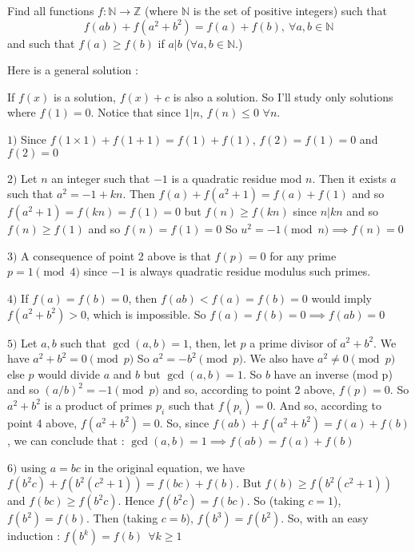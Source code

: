 \begin{mysolution}
	\begin{tcolorbox}Find all functions $ f: \mathbb{N} \rightarrow \mathbb{Z}$ (where $ \mathbb{N}$ is the set of positive integers) such that
\[ f(ab) + f\left(a^2 + b^2\right) = f(a) + f(b),\ \forall a, b \in \mathbb{N}
\]
and such that $ f(a) \geq f(b)$ if $ a | b$ ($ \forall a, b \in \mathbb{N}$.)\end{tcolorbox}

Here is a general solution :

If $ f(x)$ is a solution, $ f(x)+c$ is also a solution. So I'll study only solutions where $ f(1)=0$. Notice that since $ 1|n$, $ f(n)\leq 0$ $ \forall n$.

$ 1)$ Since $ f(1\times 1) + f(1 + 1) = f(1) + f(1)$, $ f(2) = f(1)=0$ and $ \boxed{f(2)=0}$ 

$ 2)$ Let $ n$ an integer such that $ -1$ is a quadratic residue mod $ n$. Then it exists $ a$ such that $ a^2 = - 1 + kn$.
Then $ f(a) + f(a^2 + 1) = f(a) + f(1)$ and so $ f(a^2 + 1) = f(kn) = f(1)=0$ but $ f(n)\geq f(kn)$ since $ n|kn$ and so $ f(n)\geq f(1)$ and so $ f(n) = f(1)=0$
So $ \boxed{u^2=-1\pmod{n}\implies f(n)=0}$ 

$ 3)$ A consequence of point 2 above is that $ f(p)=0$ for any prime $ p=1\pmod{4}$ since $ -1$ is always quadratic residue modulus such primes.

$ 4)$ If $ f(a)=f(b)=0$, then $ f(ab) < f(a) = f(b) = 0$ would imply $ f(a^2 + b^2) > 0$, which is impossible. So
$ \boxed{f(a)=f(b)=0\implies f(ab)=0}$

$ 5)$ Let $ a,b$ such that $ \gcd(a,b)=1$, then, let $ p$ a prime divisor of $ a^2+b^2$. We have $ a^2+b^2=0\pmod{p}$ So $ a^2=-b^2\pmod{p}$. We also have $ a^2\neq 0\pmod{p}$ else $ p$ would divide $ a$ and $ b$ but $ \gcd(a,b)=1$. So $ b$ have an inverse (mod p) and so $ (a/b)^2=-1\pmod{p}$ and so, according to point 2 above, $ f(p)=0$.
So $ a^2+b^2$ is a product of primes $ p_i$ such that $ f(p_i)=0$. And so, according to point 4 above, $ f(a^2+b^2)=0$. So, since  $ f(ab)+f(a^2+b^2)=f(a)+f(b)$, we can conclude that :
$ \boxed{\gcd(a,b)=1\implies f(ab)=f(a)+f(b)}$

$ 6)$ using $ a=bc$ in the original equation, we have $ f(b^2c)+f(b^2(c^2+1))=f(bc)+f(b)$. But $ f(b)\geq f(b^2(c^2+1))$ and $ f(bc)\geq f(b^2c)$.
Hence $ f(b^2c)=f(bc)$. So (taking $ c=1$), $ f(b^2)=f(b)$. Then (taking $ c=b$), $ f(b^3)=f(b^2)$. So, with an easy induction :
$ \boxed{f(b^k)=f(b)\: \: \forall k\geq 1}$


\end{mysolution}
